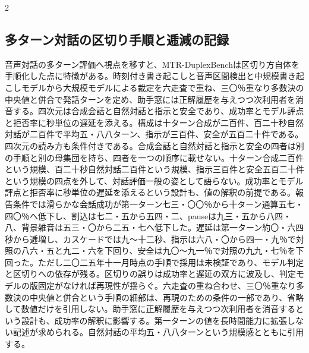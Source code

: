 \documentclass[lualatex,a4paper,10pt]{jlreq}
\begin{document}
\begin{multicols}{2}
\subsection{多ターン対話の区切り手順と逓減の記録}
音声対話の多ターン評価へ視点を移すと、MTR-DuplexBenchは区切り方自体を手順化した点に特徴がある。時刻付き書き起こしと音声区間検出と中規模書き起こしモデルから大規模モデルによる裁定を六走査で重ね、三〇％重なり多数決の中央値と併合で発話ターンを定め、助手窓には正解履歴を与えつつ次利用者を消音する。四次元は合成会話と自然対話と指示と安全であり、成功率とモデル評点と拒否率に秒単位の遅延を添える。構成は十ターン合成が二百件、百二十秒自然対話が二百件で平均五・八八ターン、指示が三百件、安全が五百二十件である\autocite{btd135}。四次元の読み方も条件付きである。合成会話と自然対話と指示と安全の四者は別の手順と別の母集団を持ち、四者を一つの順序に載せない。十ターン合成二百件という規模、百二十秒自然対話二百件という規模、指示三百件と安全五百二十件という規模の四点を外して、対話評価一般の姿として語らない。成功率とモデル評点と拒否率に秒単位の遅延を添えるという設計も、値の解釈の前提である\autocite{btd135}。報告条件では滑らかな会話成功が第一ターン七三・〇〇％から十ターン通算五七・四〇％へ低下し、割込は七二・五から五四・二、pauseは九三・五から八四・八、背景雑音は五三・〇から二五・七へ低下した。遅延は第一ターン約〇・六四秒から逓増し、カスケードでは九〜十二秒、指示は六八・〇から四一・九％で対照の八六・五と九二・六を下回り、安全は九〇〜九一％で対照の九九・七％を下回った\autocite{btd135}。ただし二〇二五年十一月時点の手順で採用は未検証であり、モデル判定と区切りへの依存が残る。区切りの誤りは成功率と遅延の双方に波及し、判定モデルの版固定がなければ再現性が揺らぐ\autocite{btd135}。六走査の重ね合わせ、三〇％重なり多数決の中央値と併合という手順の細部は、再現のための条件の一部であり、省略して数値だけを引用しない。助手窓に正解履歴を与えつつ次利用者を消音するという設計も、成功率の解釈に影響する。第一ターンの値を長時間能力に拡張しない記述が求められる。自然対話の平均五・八八ターンという規模感とともに引用する\autocite{btd135}。


\end{multicols}
\end{document}

